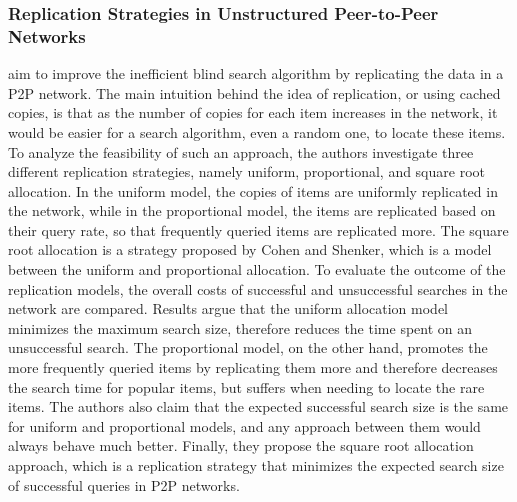 \subsubsection{Replication Strategies in Unstructured Peer-to-Peer Networks}
\cite{CS2002} aim to improve the inefficient blind search algorithm by
replicating the data in a P2P network. The main intuition behind the
idea of replication, or using cached copies, is that as the number of copies for
each item increases in the network, it would be easier for a search algorithm,
even a random one, to locate these items. To analyze the feasibility of
such an approach, the authors investigate three different replication
strategies, namely uniform, proportional, and square root allocation. In the
uniform model, the copies of items are uniformly replicated in the network,
while in the proportional model, the items are replicated based on their query
rate, so that frequently queried items are replicated more. The square root
allocation is a strategy proposed by Cohen and Shenker, which is a model between
the uniform and proportional allocation.  To evaluate the outcome of
the replication models, the overall costs of successful and unsuccessful
searches in the network are compared. Results argue that the uniform allocation
model minimizes the maximum search size, therefore reduces the time spent on an
unsuccessful search. The proportional model, on the other hand, promotes the
more frequently queried items by replicating them more and therefore decreases the
search time for popular items, but suffers when needing to locate the rare
items. The authors also claim that the expected successful search size is the
same for uniform and proportional models, and any approach between them would
always behave much better. Finally, they propose the square root allocation
approach, which is a replication strategy that minimizes the expected search
size of successful queries in P2P networks.

